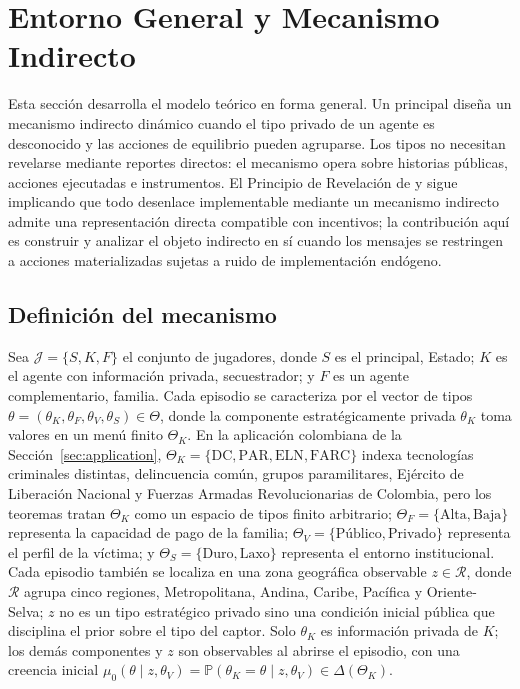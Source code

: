\documentclass[review,authoryear,12pt]{elsarticle}
\theoremstyle{plain}
\theoremstyle{definition}
\newcommand{\Prob}{\mathbb{P}}
\newcommand{\ThetaK}{\Theta_K}
\newcommand{\1}{\mathbf{1}}
\begin{document}
\section{Entorno General y Mecanismo Indirecto}\label{sec:model}

Esta sección desarrolla el modelo teórico en forma general. Un principal diseña un mecanismo indirecto dinámico cuando el tipo privado de un agente es desconocido y las acciones de equilibrio pueden agruparse. Los tipos no necesitan revelarse mediante reportes directos: el mecanismo opera sobre historias públicas, acciones ejecutadas e instrumentos. El Principio de Revelación de \citet{Gibbard1973} y \citet{Myerson1979IC,Myerson1981} sigue implicando que todo desenlace implementable mediante un mecanismo indirecto admite una representación directa compatible con incentivos; la contribución aquí es construir y analizar el objeto indirecto en sí cuando los mensajes se restringen a acciones materializadas sujetas a ruido de implementación endógeno.

\subsection{Definición del mecanismo}\label{subsec:def-mecanismo}


Sea $\mathcal{J}=\{S,K,F\}$ el conjunto de jugadores, donde $S$ es el principal, Estado; $K$ es el agente con información privada, secuestrador; y $F$ es un agente complementario, familia. Cada episodio se caracteriza por el vector de tipos $\theta=(\theta_K,\theta_F,\theta_V,\theta_S)\in\Theta$, donde la componente estratégicamente privada $\theta_K$ toma valores en un menú finito $\ThetaK$. En la aplicación colombiana de la Sección~\ref{sec:application}, $\ThetaK=\{\text{DC},\text{PAR},\text{ELN},\text{FARC}\}$ indexa tecnologías criminales distintas, delincuencia común, grupos paramilitares, Ejército de Liberación Nacional y Fuerzas Armadas Revolucionarias de Colombia, pero los teoremas tratan $\ThetaK$ como un espacio de tipos finito arbitrario; $\Theta_F=\{\text{Alta},\text{Baja}\}$ representa la capacidad de pago de la familia; $\Theta_V=\{\text{Público},\text{Privado}\}$ representa el perfil de la víctima; y $\Theta_S=\{\text{Duro},\text{Laxo}\}$ representa el entorno institucional. Cada episodio también se localiza en una zona geográfica observable $z\in\mathcal{R}$, donde $\mathcal{R}$ agrupa cinco regiones, Metropolitana, Andina, Caribe, Pacífica y Oriente-Selva; $z$ no es un tipo estratégico privado sino una condición inicial pública que disciplina el prior sobre el tipo del captor. Solo $\theta_K$ es información privada de $K$; los demás componentes y $z$ son observables al abrirse el episodio, con una creencia inicial $\mu_0(\theta\mid z,\theta_V)=\Prob(\theta_K=\theta\mid z,\theta_V)\in\Delta(\ThetaK)$.
\end{document}
